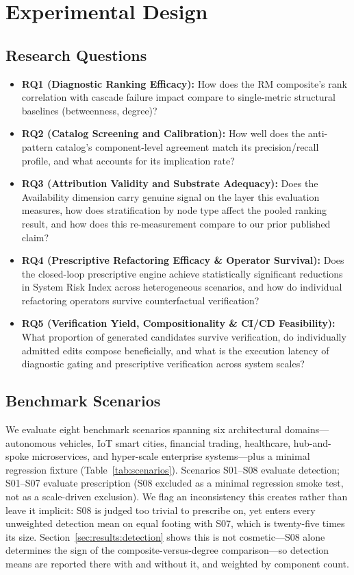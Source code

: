 \section{Experimental Design}
\label{sec:experimental_design}

\subsection{Research Questions}
\label{sec:exp:rqs}

\begin{itemize}
    \item \textbf{RQ1 (Diagnostic Ranking Efficacy):} How does the RM composite's rank correlation with cascade failure impact compare to single-metric structural baselines (betweenness, degree)?
    \item \textbf{RQ2 (Catalog Screening and Calibration):} How well does the anti-pattern catalog's component-level agreement match its precision/recall profile, and what accounts for its implication rate?
    \item \textbf{RQ3 (Attribution Validity and Substrate Adequacy):} Does the Availability dimension carry genuine signal on the layer this evaluation measures, how does stratification by node type affect the pooled ranking result, and how does this re-measurement compare to our prior published claim?
    \item \textbf{RQ4 (Prescriptive Refactoring Efficacy \& Operator Survival):} Does the closed-loop prescriptive engine achieve statistically significant reductions in System Risk Index across heterogeneous scenarios, and how do individual refactoring operators survive counterfactual verification?
    \item \textbf{RQ5 (Verification Yield, Compositionality \& CI/CD Feasibility):} What proportion of generated candidates survive verification, do individually admitted edits compose beneficially, and what is the execution latency of diagnostic gating and prescriptive verification across system scales?
\end{itemize}

\subsection{Benchmark Scenarios}
\label{sec:exp:scenarios}

We evaluate eight benchmark scenarios spanning six architectural domains---autonomous vehicles, IoT smart cities, financial trading, healthcare, hub-and-spoke microservices, and hyper-scale enterprise systems---plus a minimal regression fixture (Table~\ref{tab:scenarios}). Scenarios S01--S08 evaluate detection; S01--S07 evaluate prescription (S08 excluded as a minimal regression smoke test, not as a scale-driven exclusion). We flag an inconsistency this creates rather than leave it implicit: S08 is judged too trivial to prescribe on, yet enters every unweighted detection mean on equal footing with S07, which is twenty-five times its size. Section~\ref{sec:results:detection} shows this is not cosmetic---S08 alone determines the sign of the composite-versus-degree comparison---so detection means are reported there with and without it, and weighted by component count.

